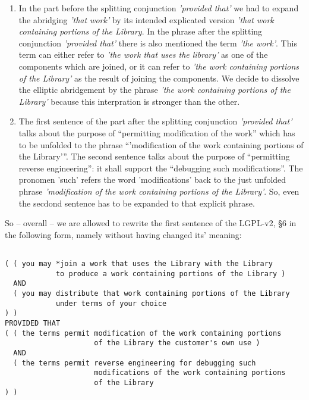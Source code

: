 \begin{enumerate}
  \item  In the part before the splitting conjunction \emph{'provided that'} we
  had to expand the abridging \emph{'that work'} by its intended explicated
  version \emph{'that work containing portions of the Library}. In the phrase
  after the splitting conjunction \emph{'provided that'} there is also mentioned
  the term \emph{'the work'}. This term can either refer to \emph{'the work that
  uses the library'} as one of the components which are joined, or it can refer
  to \emph{'the work containing portions of the Library'} as the result of
  joining the components. We decide to dissolve the elliptic abridgement by the
  phrase \emph{'the work containing portions of the Library'} because this
  interpration is stronger than the other.
  \item The first sentence of the part after the splitting conjunction
  \emph{'provided that'} talks about the purpose of \enquote{permitting 
  modification of the work} which has to be unfolded to the phrase
  \enquote{'modification of the work containing portions of the Library'}.
  The second sentence talks about the purpose of \enquote{permitting reverse
  engineering}: it shall support the \enquote{debugging such modifications}.
  The pronomen 'such' refers the word 'modifications' back to the just unfolded
  phrase \emph{'modification of the work containing portions of the Library'}.
  So, even the secdond sentence has to be expanded to that explicit phrase.
\end{enumerate}

So -- overall -- we are allowed to rewrite the first sentence of the LGPL-v2, §6
in the following form, namely without having changed its' meaning:

\begin{verbatim}

( ( you may *join a work that uses the Library with the Library
            to produce a work containing portions of the Library )
  AND 
  ( you may distribute that work containing portions of the Library
            under terms of your choice 
) )
PROVIDED THAT
( ( the terms permit modification of the work containing portions 
                     of the Library the customer's own use )
  AND
  ( the terms permit reverse engineering for debugging such
                     modifications of the work containing portions 
                     of the Library   
) )
\end{verbatim}

